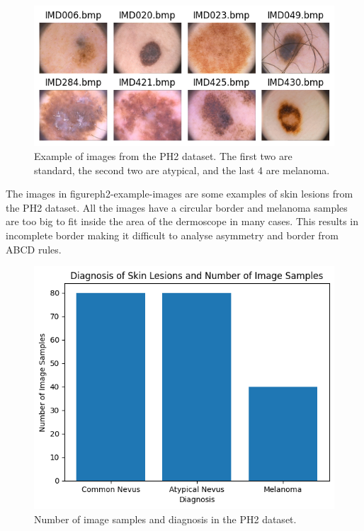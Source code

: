 \begin{figure}
	\centering
	\includegraphics[scale=0.75]{images/ph2/ph2-example-images.png}
	\caption{Example of images from the PH2 dataset. The first two are standard, the second two are atypical, and the last 4 are melanoma.}
\end{figure}\label{ph2-example-images}

The images in figure{ph2-example-images} are some examples of skin lesions from the PH2 dataset. All the images have a circular border and melanoma samples are too big to fit inside the area of the dermoscope in many cases. This results in incomplete border making it difficult to analyse asymmetry and border from ABCD rules.

\begin{figure}
	\centering
	\includegraphics[scale=0.75]{images/ph2/ph2-diagnosis-number.png}
	\caption{Number of image samples and diagnosis in the PH2 dataset.}
\end{figure}\label{ph2-diagnosis-number}

